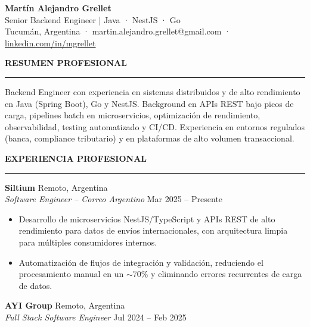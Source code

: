 \documentclass[11pt]{article}
\newcommand{\jobsep}{\vspace{8pt}}
\begin{document}
\begin{center}
    {\Large \textbf{Martín Alejandro Grellet}}\\[2pt]
    {\normalsize Senior Backend Engineer | Java · NestJS · Go}\\[2pt]
    Tucumán, Argentina · martin.alejandro.grellet@gmail.com ·
    \href{https://www.linkedin.com/in/mgrellet}{linkedin.com/in/mgrellet}
\end{center}

\vspace{20pt}

{\large \textbf{RESUMEN PROFESIONAL}}\\[3pt]
\hrule
\vspace{3pt}

Backend Engineer con experiencia en sistemas distribuidos y de alto rendimiento en Java (Spring Boot), Go y NestJS. Background en APIs REST bajo picos de carga, pipelines batch en microservicios, optimización de rendimiento, observabilidad, testing automatizado y CI/CD. Experiencia en entornos regulados (banca, compliance tributario) y en plataformas de alto volumen transaccional.

\vspace{20pt}

{\large \textbf{EXPERIENCIA PROFESIONAL}}\\[3pt]
\hrule
\vspace{3pt}

\textbf{Siltium} \hfill Remoto, Argentina\\
\textit{Software Engineer -- Correo Argentino} \hfill Mar 2025 -- Presente

\begin{itemize}
    \item Desarrollo de microservicios NestJS/TypeScript y APIs REST de alto rendimiento para datos de envíos internacionales, con arquitectura limpia para múltiples consumidores internos.
    \item Automatización de flujos de integración y validación, reduciendo el procesamiento manual en un $\sim$70\% y eliminando errores recurrentes de carga de datos.
\end{itemize}

\jobsep

\textbf{AYI Group} \hfill Remoto, Argentina\\
\textit{Full Stack Software Engineer} \hfill Jul 2024 -- Feb 2025
\end{document}
